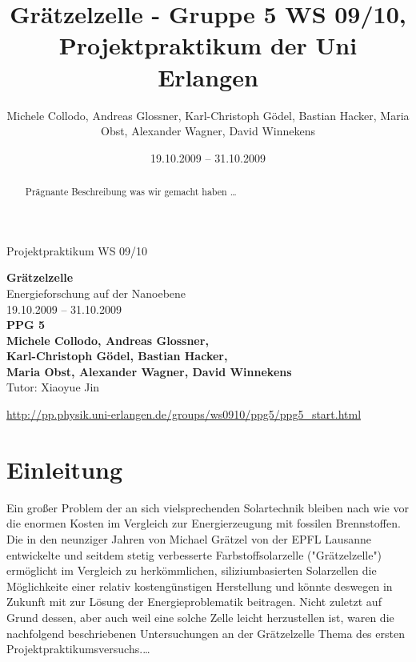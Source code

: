 \documentclass[11pt]{scrartcl}
\title{Gr\"atzelzelle - Gruppe 5 WS 09/10, Projektpraktikum der Uni Erlangen}
\date{19.10.2009 -- 31.10.2009}
\author{Michele Collodo, Andreas Glossner, Karl-Christoph G\"odel, Bastian Hacker, Maria Obst, Alexander Wagner, David Winnekens}
\begin{document}
\sloppy %
\thispagestyle{empty}
\large{Projektpraktikum WS 09/10}
\hfill
{}
\\[8\baselineskip]
\begin{center}
{\Huge\textbf{Gr\"atzelzelle}}
\\[0.5\baselineskip]
{\large Energieforschung auf der Nanoebene}
\\[1.5\baselineskip]
{\Large 19.10.2009 -- 31.10.2009}
\\[6\baselineskip]
{\huge\textbf{PPG 5}}\\[0.5\baselineskip]
{\large\textbf{
Michele Collodo,
Andreas Glossner,\\
Karl-Christoph G\"odel,
Bastian Hacker,\\
Maria Obst,
Alexander Wagner,
David Winnekens}\\
Tutor: Xiaoyue Jin}
\vfill



\small{\url{http://pp.physik.uni-erlangen.de/groups/ws0910/ppg5/ppg5\_start.html}}
\end{center}
\newpage



\tableofcontents
\vfill



\begin{abstract}

Pr\"agnante Beschreibung was wir gemacht haben \ldots
\end{abstract}
\newpage





\section{Einleitung}

Ein großer Problem der an sich vielsprechenden Solartechnik bleiben nach wie vor die enormen Kosten im Vergleich zur Energierzeugung mit fossilen Brennstoffen. Die in den neunziger Jahren von Michael Grätzel von der EPFL Lausanne entwickelte und seitdem stetig verbesserte Farbstoffsolarzelle ("Grätzelzelle") ermöglicht im Vergleich zu herkömmlichen, siliziumbasierten Solarzellen die Möglichkeite einer relativ kostengünstigen Herstellung und könnte deswegen in Zukunft mit zur Lösung der Energieproblematik beitragen. Nicht zuletzt auf Grund dessen, aber auch weil eine solche Zelle leicht herzustellen ist, waren die nachfolgend beschriebenen Untersuchungen an der Grätzelzelle Thema des ersten Projektpraktikumsversuchs.\ldots
\end{document}
